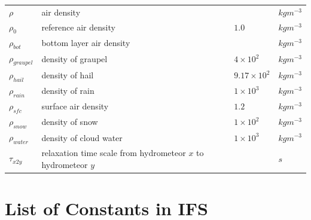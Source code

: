\documentclass[letterpaper,titlepage,10pt]{article}
\numberwithin{equation}{section}
\begin{document}
\begin{appendices}
\begin{longtable}{p{}p{}p{}p{}}
	$\rho$             & air density                                                                          &                            & $kg m^{-3}$ \\
	$\rho_0$           & reference air density                                                                & $1.0$                      & $kg m^{-3}$ \\
	$\rho_{bot}$       & bottom layer air density                                                             &                            & $kg m^{-3}$ \\
	$\rho_{graupel}$   & density of graupel                                                                   & $4 \times 10^2$            & $kg m^{-3}$ \\
	$\rho_{hail}$      & density of hail                                                                      & $9.17 \times 10^2$         & $kg m^{-3}$ \\
	$\rho_{rain}$      & density of rain                                                                      & $1 \times 10^3$            & $kg m^{-3}$ \\
	$\rho_{sfc}$       & surface air density                                                                  & $1.2$                      & $kg m^{-3}$ \\
	$\rho_{snow}$      & density of snow                                                                      & $1 \times 10^2$            & $kg m^{-3}$ \\
	$\rho_{water}$     & density of cloud water                                                               & $1 \times 10^3$            & $kg m^{-3}$ \\
	$\tau_{x2y}$       & relaxation time scale from hydrometeor $x$ to hydrometeor $y$                        &                            & $s$ \\
	\hline
\end{longtable}


\newpage
\section{List of Constants in IFS}


\end{appendices}
\end{document}
